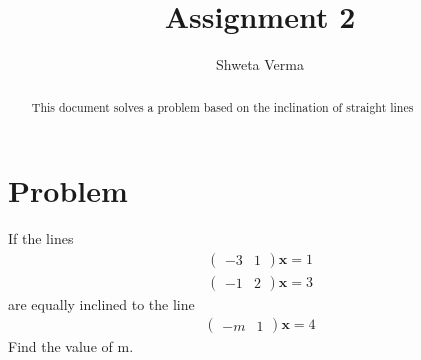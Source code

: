 \documentclass[journal,13pt,twocolumn]{IEEEtran}
\newcommand{\myvec}[1]{\ensuremath{\begin{pmatrix}#1\end{pmatrix}}}
\renewcommand{\vec}[1]{\mathbf{#1}}
\begin{document}
\title{Assignment 2} 
\author{Shweta Verma} 
\maketitle
\newpage
\bigskip
\begin{abstract}
This document solves a problem based on the inclination of straight lines
\end{abstract}
\section{\textbf{Problem}}
If the lines
\begin{align}
\myvec{-3 & 1} \vec{x} = 1\\ 
\myvec{-1 & 2} \vec{x} = 3
\end{align}
are equally inclined to the line 
\begin{align}
\myvec{-m & 1} \vec{x} = 4
\end{align}
Find the value of m.
\end{document}
